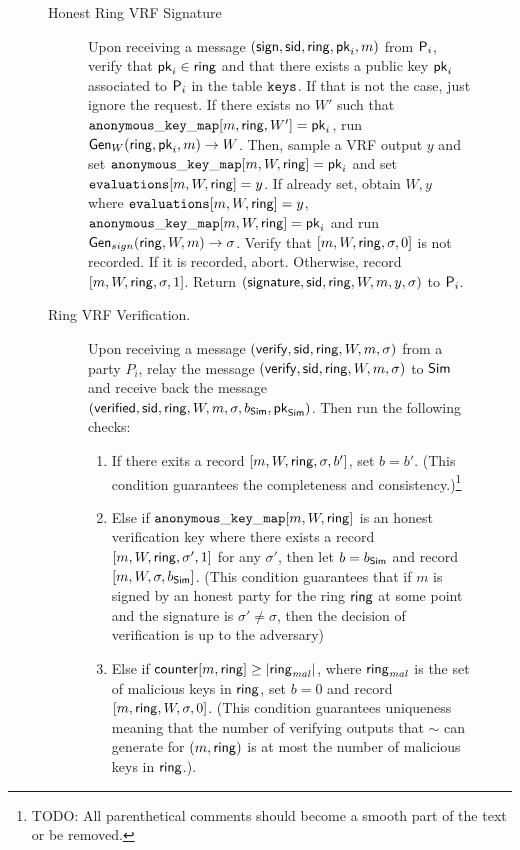 \begin{figure}
\begin{tcolorbox}
{\begin{description}
	\item[Honest Ring VRF Signature] Upon receiving a message $(\mathsf{sign}, \textsf{sid}, \mathsf{ring}, \mathsf{pk}_i, m)$ from $\mathsf{P}_i$, verify that $\mathsf{pk}_i \in \mathsf{ring}$ and that there exists a public key $\mathsf{pk}_i$ associated to $\mathsf{P}_i$ in the table $ \texttt{keys} $. If that is not the case, just ignore the request. 	
	If there exists no $ W' $ such that $ \mathtt{anonymous\_key\_map}[m, \mathsf{ring},W'] =  \mathsf{pk}_i $, run $ \mathsf{Gen}_W(\mathsf{ring}, \mathsf{pk}_i, m) \rightarrow W$. Then, sample a VRF output $y$ and set $ \mathtt{anonymous\_key\_map}[m,W,\mathsf{ring}] = \mathsf{pk}_i $ and set $ \texttt{evaluations}[m, W,\mathsf{ring}] = y$.
	If already set, obtain $ W, y $ where  $ \texttt{evaluations}[m, W, \mathsf{ring}] = y$, $ \mathtt{anonymous\_key\_map}[m,W,\mathsf{ring}] =\mathsf{pk}_i $ and run  $ \mathsf{Gen}_{sign}(\mathsf{ring}, W, m) \rightarrow \sigma $. Verify that $ [m, W,\mathsf{ring}, \sigma, 0] $ is not recorded. {\color{blue}If it is recorded}, abort. 
	Otherwise, record $ [m, W, \mathsf{ring},\sigma, 1] $. Return $(\mathsf{signature}, \textsf{sid}, \mathsf{ring},W,m, y, \sigma)$ to $\mathsf{P}_i$.
	
	\item[Ring VRF Verification.] Upon receiving a message $(\mathsf{verify}, \textsf{sid}, \mathsf{ring},W, m, \sigma)$ from a party $P_i$, relay the message $(\mathsf{verify}, \textsf{sid}, \mathsf{ring},W, m, \sigma)$ to $ \mathsf{Sim} $ and receive back the message $(\mathsf{verified}, \textsf{sid}, \mathsf{ring},W, m, \sigma, b_{\mathsf{Sim}}, \mathsf{pk}_{\mathsf{Sim}})$. Then run the following checks: 
	\begin{enumerate}[label={{C}}{{\arabic*}}, start = 1]
		\item If there exits a record $ [m,W,\mathsf{ring},\sigma, b'] $, set $ b = b' $. (This condition guarantees the completeness and consistency.)\footnote{ \color{blue} TODO: All parenthetical comments should become a smooth part of the text or be removed.}
		\label{cond:consistency}
	
		\item Else if $ \mathtt{anonymous\_key\_map}[m,W,\mathsf{ring}]  $ is an honest verification key where  there exists a record $ [m, W,\mathsf{ring}, \sigma', 1] $ for any $ \sigma' $, then let $ b= b_{\mathsf{Sim}} $ and record $ [m, W,\sigma, b_{\mathsf{Sim}}] $. (This condition guarantees that if $ m $ is signed by an honest party for the ring $ \mathsf{ring} $ at some point and the signature is $ \sigma' \neq \sigma $, then the decision of verification is up to the adversary) \label{cond:differentsignature}
		
		\item Else if $\mathsf{counter}[m, \mathsf{ring}] \geq |\mathsf{ring}_{\mathit{mal}}|$, where $\mathsf{ring}_{\mathit{mal}}$ is the set of malicious keys in $ \mathsf{ring} $, set $ b = 0 $ and record $ [m, \mathsf{ring},W,\sigma, 0] $.
		(This condition guarantees  uniqueness meaning that the number of verifying outputs that $ \sim $ can generate for $(m, \mathsf{ring})$ 
		is at most the  number of malicious keys in $ \mathsf{ring} $.)\label{cond:uniqueness}.
		

\end{enumerate}
\end{description}}
\end{tcolorbox}
\end{figure}
